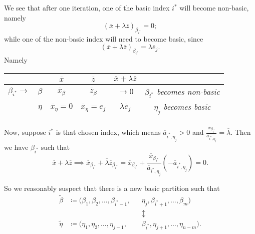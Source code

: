 \begin{answer}
	We see that after one iteration, one of the basic index \(i^{*}\) will become non-basic, namely
	\[
		(\overline{x} + \lambda \overline{z})_{\beta_{i^{*}}} = 0;
	\]
	while one of the non-basic index will need to become basic, since
	\[
		(\overline{x} + \lambda \overline{z})_{\beta_{i^{*}}} = \lambda \overline{e}_j.
	\]
	Namely
	\begin{table}[H]
		\centering
		\begin{tabular}{cc|c|c|cc}
			\toprule
			                       &           & \(\overline{x}\)            & \(\overline{z}\)                & \(\overline{x} + \lambda \overline{z}\) &                                            \\
			\midrule
			\(\beta_{i^{*}} \to \) & \(\beta\) & \(\overline{x}_{\beta}\)    & \(\overline{z}_{\beta}\)        & \(\to 0\)                               & \emph{\(\beta_{i^{*}}\) becomes non-basic} \\\hline
			                       & \(\eta\)  & \(\overline{x}_{\eta} = 0\) & \(\overline{x}_{\eta} = e_{j}\) & \(\lambda \overline{e}_j\)              & \emph{\(\eta_{j}\) becomes basic}          \\
			\bottomrule
		\end{tabular}
	\end{table}
\end{answer}

Now, suppose \(i^{*}\) is that chosen index, which means \(\overline{a}_{i^{*}, \eta_{j}}>0\) and \(\frac{\overline{x}_{\beta_{i^{*}}}}{\overline{a}_{i^{*}, \eta_{j}}} = \overline{\lambda}\). Then we have
\(\beta_{i^{*}}\) such that
\[
	\overline{x} + \lambda \overline{z} \implies \overline{x}_{\beta_{i^{*}}} + \overline{\lambda} \overline{z}_{\beta_{i^{*}}} = \overline{x}_{\beta_{i^{*}}}+\frac{\overline{x}_{\beta_{i^{*}}}}{\overline{a}_{i^{*}, \eta_{j}}}\left( -\overline{a}_{i^{*}, \eta_{j}} \right) = 0.
\]

So we reasonably suspect that there is a new basic partition such that
\[
	\begin{alignedat}{5}
		\widetilde{\beta} &\coloneqq ( \beta_1, \beta_2, \ldots , \beta_{i^{*}-1}, &&\eta_{j}, \beta_{i^{*}+1}, \ldots , \beta_m ) \\
		& &&\updownarrow\\
		\widetilde{\eta} &\coloneqq ( \eta_1, \eta_2, \ldots , \eta_{j - 1}, &&\beta_{i^{*}}, \eta_{j+1}, \ldots , \eta_{n-m} ).
	\end{alignedat}
\]

